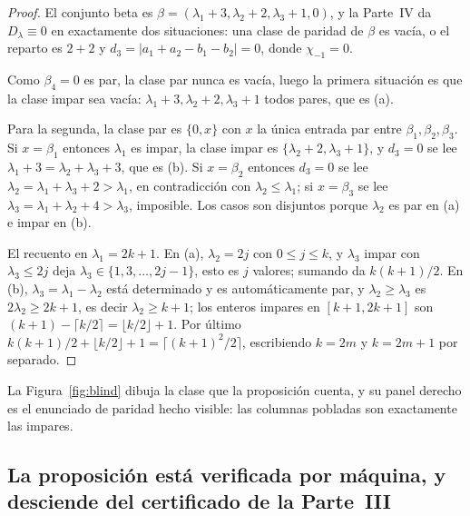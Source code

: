 \documentclass[11pt,a4paper]{article}
\begin{document}
\begin{proof}
El conjunto beta es $\beta=(\lambda_1+3,\lambda_2+2,\lambda_3+1,0)$, y la Parte~IV da
$D_\lambda\equiv0$ en exactamente dos situaciones: una clase de paridad de $\beta$ es vacía, o el
reparto es $2+2$ y $d_3=|a_1+a_2-b_1-b_2|=0$, donde $\chi_{-1}=0$.

Como $\beta_4=0$ es par, la clase par nunca es vacía, luego la primera situación es que la clase
impar sea vacía: $\lambda_1+3,\lambda_2+2,\lambda_3+1$ todos pares, que es (a).

Para la segunda, la clase par es $\{0,x\}$ con $x$ la única entrada par entre
$\beta_1,\beta_2,\beta_3$. Si $x=\beta_1$ entonces $\lambda_1$ es impar, la clase impar es
$\{\lambda_2+2,\lambda_3+1\}$, y $d_3=0$ se lee $\lambda_1+3=\lambda_2+\lambda_3+3$, que es (b). Si
$x=\beta_2$ entonces $d_3=0$ se lee $\lambda_2=\lambda_1+\lambda_3+2>\lambda_1$, en contradicción con
$\lambda_2\le\lambda_1$; si $x=\beta_3$ se lee $\lambda_3=\lambda_1+\lambda_2+4>\lambda_3$,
imposible. Los casos son disjuntos porque $\lambda_2$ es par en (a) e impar en (b).

El recuento en $\lambda_1=2k+1$. En (a), $\lambda_2=2j$ con $0\le j\le k$, y $\lambda_3$ impar con
$\lambda_3\le 2j$ deja $\lambda_3\in\{1,3,\dots,2j-1\}$, esto es $j$ valores; sumando da
$k(k+1)/2$. En (b), $\lambda_3=\lambda_1-\lambda_2$ está determinado y es automáticamente par, y
$\lambda_2\ge\lambda_3$ es $2\lambda_2\ge 2k+1$, es decir $\lambda_2\ge k+1$; los enteros impares en
$[k+1,2k+1]$ son $(k+1)-\lceil k/2\rceil=\lfloor k/2\rfloor+1$. Por último
$k(k+1)/2+\lfloor k/2\rfloor+1=\lceil (k+1)^2/2\rceil$, escribiendo $k=2m$ y $k=2m+1$ por separado.
\end{proof}

\noindent La Figura~\ref{fig:blind} dibuja la clase que la proposición cuenta, y su panel derecho es
el enunciado de paridad hecho visible: las columnas pobladas son exactamente las impares.


\subsection{La proposición está verificada por máquina, y desciende del certificado de la Parte~III}
\label{sec:lean}
\end{document}
